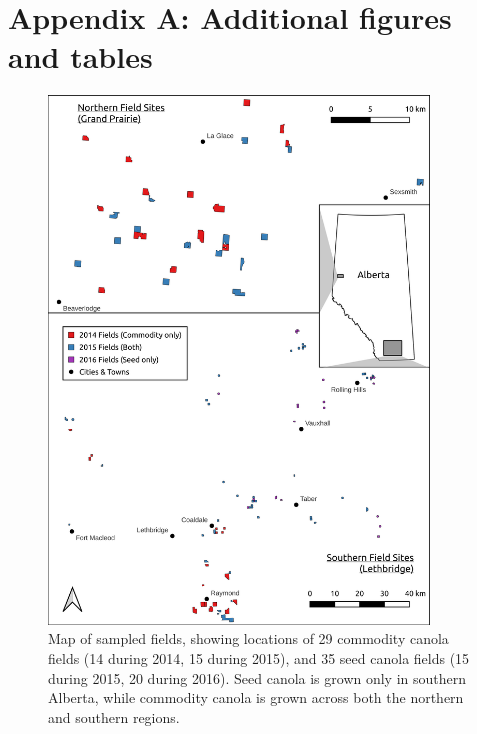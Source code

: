 \setcounter{equation}{0} %
\setcounter{figure}{0}
\setcounter{table}{0}
\makeatletter
\renewcommand{\theequation}{S\arabic{equation}} %
\renewcommand{\thefigure}{S\arabic{figure}}
\renewcommand{\thetable}{S\arabic{table}}
\renewcommand{\bibnumfmt}[1]{[S#1]}
\renewcommand{\citenumfont}[1]{S#1}

\clearpage
\section*{Appendix A: Additional figures and tables}

\begin{figure}[h]
    \centering
    \includegraphics[width=0.9\textwidth,keepaspectratio=true]{../Figures/FieldLocations.png}
    \caption{Map of sampled fields, showing locations of 29 commodity canola fields (14 during 2014, 15 during 2015), and 35 seed canola fields (15 during 2015, 20 during 2016). Seed canola is grown only in southern Alberta, while commodity canola is grown across both the northern and southern regions.}
    \label{fig:fieldMap}
\end{figure}


